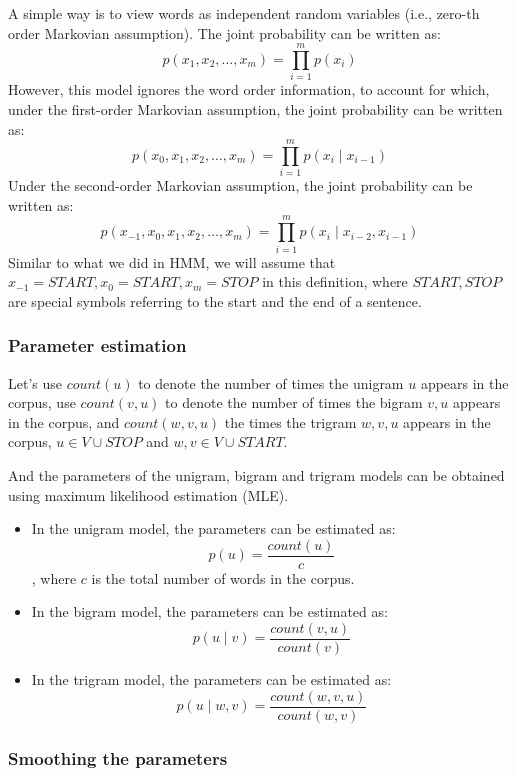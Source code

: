 \documentclass[11pt]{article}
\providecommand{\tightlist}{%
      \setlength{\itemsep}{0pt}\setlength{\parskip}{0pt}}
\begin{document}
A simple way is to view words as independent random variables (i.e.,
zero-th order Markovian assumption). The joint probability can be
written as: \[p(x_1, x_2, …, x_m)=\prod_{i=1}^m p(x_i)\] However, this
model ignores the word order information, to account for which, under
the first-order Markovian assumption, the joint probability can be
written as:
\[p(x_0, x_1, x_2, …, x_m)= \prod_{i=1}^{m}p(x_i \mid x_{i-1})\] Under
the second-order Markovian assumption, the joint probability can be
written as:
\[p(x_{-1}, x_0, x_1, x_2, …, x_m)= \prod_{i=1}^{m}p(x_i \mid x_{i-2}, x_{i-1})\]
Similar to what we did in HMM, we will assume that
\(x_{-1}=START, x_0=START, x_m = STOP\) in this definition, where
\(START, STOP\) are special symbols referring to the start and the end
of a sentence.

    \hypertarget{parameter-estimation}{%
\subsubsection{Parameter estimation}\label{parameter-estimation}}

Let's use \(count(u)\) to denote the number of times the unigram \(u\)
appears in the corpus, use \(count(v, u)\) to denote the number of times
the bigram \(v, u\) appears in the corpus, and \(count(w, v, u)\) the
times the trigram \(w, v, u\) appears in the corpus,
\(u \in V \cup STOP\) and \(w, v \in V \cup START\).

And the parameters of the unigram, bigram and trigram models can be
obtained using maximum likelihood estimation (MLE).

\begin{itemize}
\tightlist
\item
  In the unigram model, the parameters can be estimated as:
  \[p(u) = \frac {count(u)}{c}\], where \(c\) is the total number of
  words in the corpus.
\item
  In the bigram model, the parameters can be estimated as:
  \[p(u \mid v) = \frac{count(v, u)}{count(v)}\]
\item
  In the trigram model, the parameters can be estimated as:
  \[p(u \mid w, v) = \frac{count(w, v, u)}{count(w, v)}\]
\end{itemize}

    \hypertarget{smoothing-the-parameters}{%
\subsubsection{Smoothing the
parameters}\label{smoothing-the-parameters}}
\end{document}
